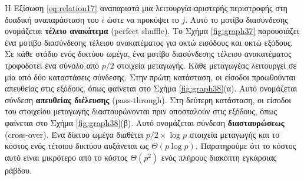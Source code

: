 \documentclass[12pt,a4paper]{article}
\begin{document}
Η Εξίσωση \ref{eq:relation17} αναπαριστά μια λειτουργία αριστερής 
περιστροφής στη δυαδική αναπαράσταση του $i$ ώστε να προκύψει το $j$. 
Αυτό το μοτίβο διασύνδεσης ονομάζεται \textbf{τέλειο ανακάτεμα} 
(\foreignlanguage{english}{perfect shuffle}). Το Σχήμα \ref{fig:graph37} 
παρουσιάζει ένα μοτίβο διασύνδεσης τέλειου ανακατέματος για
οκτώ εισόδους και οκτώ εξόδους. Σε κάθε στάδιο ενός δικτύου ωμέγα, ένα 
μοτίβο διασύνδεσης τέλειου ανακατέματος τροφοδοτεί ένα σύνολο από 
$p/2$ στοιχεία μεταγωγής. Κάθε μεταγωγέας λειτουργεί σε μία από δύο 
καταστάσεις σύνδεσης. Στην πρώτη κατάσταση, οι είσοδοι προωθούνται 
απευθείας στις εξόδους, όπως φαίνεται στο Σχήμα \ref{fig:graph38}(α). Αυτό ονομάζεται 
σύνδεση \textbf{απευθείας διέλευσης} (\foreignlanguage{english}{pass-through}). Στη δεύτερη κατάσταση, 
οι είσοδοι του στοιχείου μεταγωγής διασταυρώνονται πριν αποσταλούν στις 
εξόδους, όπως φαίνεται στο Σχήμα \ref{fig:graph38}(β). Αυτό ονομάζεται σύνδεση 
\textbf{διασταυρώσεως} (\foreignlanguage{english}{cross-over}). Ένα δίκτυο 
ωμέγα διαθέτει $p/2 \times \log p$ στοιχεία μεταγωγής και το κόστος ενός 
τέτοιου δικτύου αυξάνεται ως $\Theta(p \log p)$. Παρατηρούμε ότι το κόστος 
αυτό είναι μικρότερο από το κόστος $\Theta(p^2)$ ενός πλήρους διακόπτη 
εγκάρσιας ράβδου.
\vspace{0.3cm}
\end{document}
